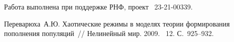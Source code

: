
Работа выполнена при поддержке РНФ, проект \textnumero~23-21-00339.
%

%

\begin{thebibliography}{9} %

 Переварюха~А.Ю. Хаотические режимы в моделях теории формирования пополнения популяций~// Нелинейный мир. 2009. \textnumero~12. С.~925--932.

\end{thebibliography}





%

